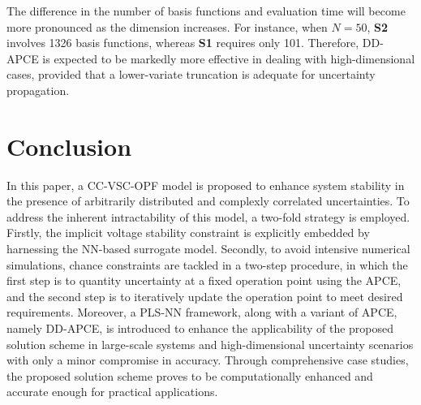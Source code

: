 \documentclass[journal]{IEEEtran}
\theoremstyle{definition}
\theoremstyle{remark}
\begin{document}
The difference in the number of basis functions and evaluation time will become more pronounced as the dimension increases. For instance, when $N=50$, \textbf{S2} involves 1326 basis functions, whereas \textbf{S1} requires only 101.
Therefore, DD-APCE is expected to be markedly more effective in dealing with high-dimensional cases, provided that a lower-variate truncation is adequate for uncertainty propagation.
\vspace{-9pt}
\section{Conclusion}\label{conclusion}
In this paper, a CC-VSC-OPF model is proposed to enhance system stability in the presence of arbitrarily distributed and complexly correlated uncertainties. To address the inherent intractability of this model, a two-fold strategy is employed. Firstly, the implicit voltage stability constraint is explicitly embedded by harnessing the NN-based surrogate model. Secondly, to avoid intensive numerical simulations, chance constraints are tackled in a two-step procedure, in which the first step is to quantity uncertainty at a fixed operation point using the APCE, and the second step is to iteratively update the operation point to meet desired requirements. Moreover, a PLS-NN framework, along with a variant of APCE, namely DD-APCE, is introduced to enhance the applicability of the proposed solution scheme in large-scale systems and high-dimensional uncertainty scenarios with only a minor compromise in accuracy. Through comprehensive case studies, the proposed solution scheme proves to be computationally enhanced and accurate enough for practical applications.







%
\end{document}
